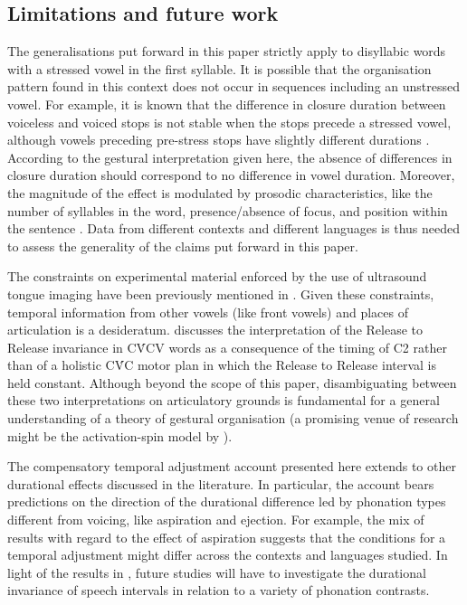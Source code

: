 \documentclass[12pt,]{article}
\begin{document}
\hypertarget{limitations-and-future-work}{%
\subsection{Limitations and future
work}\label{limitations-and-future-work}}

The generalisations put forward in this paper strictly apply to
disyllabic words with a stressed vowel in the first syllable. It is
possible that the organisation pattern found in this context does not
occur in sequences including an unstressed vowel. For example, it is
known that the difference in closure duration between voiceless and
voiced stops is not stable when the stops precede a stressed vowel,
although vowels preceding pre-stress stops have slightly different
durations \citep{davis1989}. According to the gestural interpretation
given here, the absence of differences in closure duration should
correspond to no difference in vowel duration. Moreover, the magnitude
of the effect is modulated by prosodic characteristics, like the number
of syllables in the word, presence/absence of focus, and position within
the sentence \citep[\citet{klatt1973}, \citet{laeufer1992},
\citet{de-jong2004}]{sharf1962}. Data from different contexts and
different languages is thus needed to assess the generality of the
claims put forward in this paper.

The constraints on experimental material enforced by the use of
ultrasound tongue imaging have been previously mentioned in
. Given these constraints, temporal information from
other vowels (like front vowels) and places of articulation is a
desideratum.  discusses the interpretation of the
Release to Release invariance in CV́CV words as a consequence of the
timing of C2 rather than of a holistic CV́C motor plan in which the
Release to Release interval is held constant. Although beyond the scope
of this paper, disambiguating between these two interpretations on
articulatory grounds is fundamental for a general understanding of a
theory of gestural organisation (a promising venue of research might be
the activation-spin model by \citealt{tilsen2013}).

The compensatory temporal adjustment account presented here extends to
other durational effects discussed in the literature. In particular, the
account bears predictions on the direction of the durational difference
led by phonation types different from voicing, like aspiration and
ejection. For example, the mix of results with regard to the effect of
aspiration \citep{durvasula2012} suggests that the conditions for a
temporal adjustment might differ across the contexts and languages
studied. In light of the results in \citet{begus2017}, future studies
will have to investigate the durational invariance of speech intervals
in relation to a variety of phonation contrasts.
\end{document}
